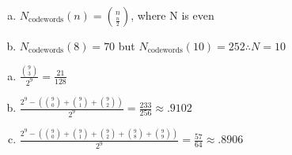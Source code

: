 \documentclass[12pt]{article}
\newenvironment{problem}[2][Problem]{\begin{trivlist}
\item[\hskip \labelsep {\bfseries #1}\hskip \labelsep {\bfseries #2.}]
  \vspace{1 cm}
}{\end{trivlist}}
\begin{document}
\begin{problem}{2.37}
\item
  \begin{enumerate}[a.]
    \item %
      $N_\textrm{codewords}(n) = \binom{n}{\frac{n}{2}}$, where N is even
    \item %
      $N_\textrm{codewords}(8) = 70$ but $N_\textrm{codewords}(10) = 252 \therefore N = 10$
  \end{enumerate}
\end{problem}

\begin{problem}{2.39} 
\item
  \begin{enumerate}[a.]
    \item %
      $\frac{\binom{9}{3}}{2^9} = \frac{21}{128}$
    \item %
      $\frac{2^9 - \left(\binom{9}{0} + \binom{9}{1} + \binom{9}{2}\right)}{2^9} 
      =  \frac{233}{256} \approx .9102$
    \item %
      $\frac{2^9 - \left(\binom{9}{0} + \binom{9}{1} + \binom{9}{2} + \binom{9}{8} + \binom{9}{9}\right)}{2^9} 
      =  \frac{57}{64} \approx .8906$
  \end{enumerate}
\end{problem}
\end{document}
